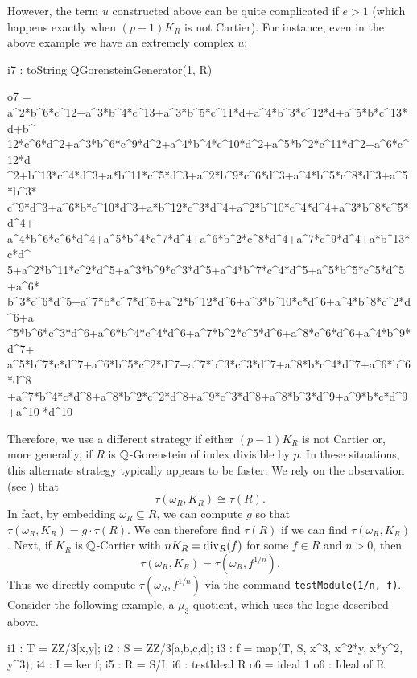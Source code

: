 \documentclass{amsart}
\begin{document}
However, the term $u$ constructed above can be quite complicated if $e > 1$ (which happens exactly when $(p -1)K_R$ is not Cartier).  For instance, even in the above example we have an extremely complex $u$:

\medskip
{\small{}
\begin{MyVerbatim}
i7 : toString QGorensteinGenerator(1, R)
   
o7 = a^2*b^6*c^12+a^3*b^4*c^13+a^3*b^5*c^11*d+a^4*b^3*c^12*d+a^5*b*c^13*d+b^
     12*c^6*d^2+a^3*b^6*c^9*d^2+a^4*b^4*c^10*d^2+a^5*b^2*c^11*d^2+a^6*c^12*d
     ^2+b^13*c^4*d^3+a*b^11*c^5*d^3+a^2*b^9*c^6*d^3+a^4*b^5*c^8*d^3+a^5*b^3*
     c^9*d^3+a^6*b*c^10*d^3+a*b^12*c^3*d^4+a^2*b^10*c^4*d^4+a^3*b^8*c^5*d^4+
     a^4*b^6*c^6*d^4+a^5*b^4*c^7*d^4+a^6*b^2*c^8*d^4+a^7*c^9*d^4+a*b^13*c*d^
     5+a^2*b^11*c^2*d^5+a^3*b^9*c^3*d^5+a^4*b^7*c^4*d^5+a^5*b^5*c^5*d^5+a^6*
     b^3*c^6*d^5+a^7*b*c^7*d^5+a^2*b^12*d^6+a^3*b^10*c*d^6+a^4*b^8*c^2*d^6+a
     ^5*b^6*c^3*d^6+a^6*b^4*c^4*d^6+a^7*b^2*c^5*d^6+a^8*c^6*d^6+a^4*b^9*d^7+
     a^5*b^7*c*d^7+a^6*b^5*c^2*d^7+a^7*b^3*c^3*d^7+a^8*b*c^4*d^7+a^6*b^6*d^8
     +a^7*b^4*c*d^8+a^8*b^2*c^2*d^8+a^9*c^3*d^8+a^8*b^3*d^9+a^9*b*c*d^9+a^10
     *d^10
\end{MyVerbatim}
}\medskip

Therefore, we use a different strategy if either $(p-1)K_R$ is not Cartier or, more generally, if $R$ is $\mathbb{Q}$-Gorenstein of index divisible by $p$.
In these situations, this alternate strategy typically appears to be faster.  We rely on the observation (see \cite{BlickleSchwedeTuckerTestAlterations}) that
\[
\tau(\omega_R, K_R) \cong \tau(R).
\]
In fact, by embedding $\omega_R \subseteq R$, we can compute $g$ so that $\tau(\omega_R, K_R) = g\cdot \tau(R)$.  We can therefore find $\tau(R)$ if we can find $\tau(\omega_R, K_R)$.
Next, if $K_R$ is $\mathbb{Q}$-Cartier with $nK_R = \operatorname{{div}}_R(f)$ for some $f \in R$ and $n > 0$, then
\[
\tau(\omega_R, K_R) =\tau(\omega_R, f^{1/n}).
\]
Thus we directly compute $\tau(\omega_R, f^{1/n})$ via the command \texttt{testModule(1/n, f)}.  Consider the following example, a $\mu_3$-quotient, which uses the logic described above.

\medskip
{\small
\begin{MyVerbatim}
i1 : T = ZZ/3[x,y];
i2 : S = ZZ/3[a,b,c,d];
i3 : f = map(T, S, {x^3, x^2*y, x*y^2, y^3});
i4 : I = ker f;
i5 : R = S/I;
i6 : testIdeal R
o6 = ideal 1
o6 : Ideal of R
\end{MyVerbatim}
}\medskip
\end{document}
